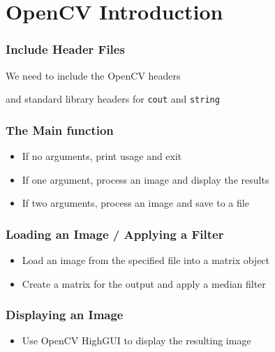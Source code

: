 \section{OpenCV Introduction}






\begin{frame}
\frametitle{Include Header Files}
\begin{center}
We need to include the OpenCV headers

\pause
\vspace{1 em}
and standard library headers for {\tt cout} and {\tt string}

\end{center}

\end{frame}


\begin{frame}
\frametitle{The Main function}
\begin{center}

\begin{itemize}
\item If no arguments, print usage and exit
\item If one argument, process an image and display the results
\item If two arguments, process an image and save to a file
\end{itemize}
\end{center}

\end{frame}


\begin{frame}
\frametitle{Loading an Image / Applying a Filter}
\begin{center}
\begin{itemize}
\item Load an image from the specified file into a matrix object
\end{itemize}

\pause
\begin{itemize}
\item Create a matrix for the output and apply a median filter
\end{itemize}

\end{center}

\end{frame}


\begin{frame}
\frametitle{Displaying an Image}
\begin{center}
\begin{itemize}
\item Use OpenCV HighGUI to display the resulting image
\end{itemize}

\end{center}
\end{frame}
